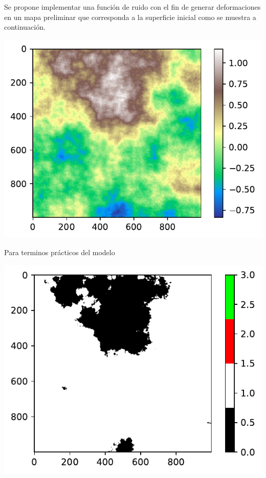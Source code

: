\documentclass[
  letterpaper,
  DIV=11,
  numbers=noendperiod]{scrartcl}
\begin{document}
Se propone implementar una función de ruido con el fin de generar
deformaciones en un mapa preliminar que corresponda a la superficie
inicial como se muestra a continuación.

\includegraphics{MCA_files/figure-pdf/cell-2-output-1.pdf}

Para terminos prácticos del modelo

\includegraphics{MCA_files/figure-pdf/cell-3-output-1.pdf}
\end{document}
